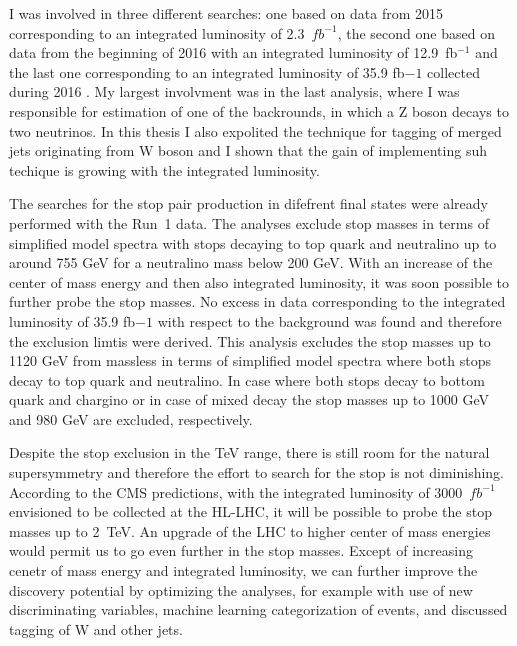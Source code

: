 I was involved in three different searches: one based on data from 2015 corresponding to an integrated luminosity of 2.3~$fb^{-1}$, the second one based on data from the beginning of 2016 with an integrated luminosity of 12.9~fb$^{-1}$ and the last one corresponding to an integrated luminosity of 35.9 fb${-1}$ collected during 2016 . My largest involvment was in the last analysis, where I was responsible for estimation of one of the backrounds, in which a Z boson decays to two neutrinos. In this thesis I also expolited the technique for tagging of merged jets originating from W boson and I shown that the gain of implementing suh techique is growing with the integrated luminosity. 

The searches for the stop pair production in difefrent final states were already performed with the Run~1 data. The analyses exclude stop masses in terms of simplified model spectra with stops decaying to top quark and neutralino up to around 755 GeV for a neutralino mass below 200 GeV. With an increase of the center of mass energy and then also integrated luminosity, it was soon possible to further probe the stop masses. No excess in data corresponding to the integrated luminosity of 35.9 fb${-1}$ with respect to the background was found and therefore the exclusion limtis were derived. This analysis excludes the stop masses up to 1120 GeV from massless in terms of simplified model spectra where both stops decay to top quark and neutralino. In case where both stops decay to bottom quark and chargino or in case of mixed decay the stop masses up to 1000 GeV  and 980 GeV are excluded, respectively.

Despite the stop exclusion in the TeV range, there is still room for the natural supersymmetry and therefore the effort to search for the stop is not diminishing. According to the CMS predictions, with the integrated luminosity of 3000~$fb^{-1}$ envisioned to be collected at the HL-LHC, it will be possible to probe the stop masses up to 2~TeV. An upgrade of the LHC to higher center of mass energies would permit us to go even further in the stop masses. Except of increasing cenetr of mass energy and integrated luminosity, we can further improve the discovery potential by optimizing the analyses, for example with use of new discriminating variables, machine learning categorization of events, and discussed tagging of W and other jets.

